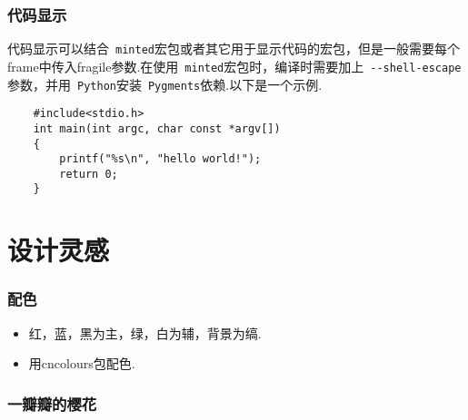 \documentclass{beamer}
\begin{document}
\begin{frame}[fragile]
    \frametitle{代码显示}
    代码显示可以结合~\verb|minted|宏包或者其它用于显示代码的宏包，但是一般需要每个frame中传入fragile参数.在使用~\verb|minted|宏包时，编译时需要加上~\verb|--shell-escape|参数，并用~\verb|Python|安装~\verb|Pygments|依赖.以下是一个示例.
    \begin{verbatim}
    #include<stdio.h>
    int main(int argc, char const *argv[])
    {
        printf("%s\n", "hello world!");
        return 0;
    }
    \end{verbatim}
\end{frame}

\section{设计灵感}
\begin{frame}
    \frametitle{配色}
    \begin{itemize}
        \item 红，蓝，黑为主，绿，白为辅，背景为缟.
        \item 用cncolours包配色.
    \end{itemize}
\end{frame}

\begin{frame}
    \frametitle{一瓣瓣的樱花}
    \begin{figure}
    \centering
    \end{figure}
\end{frame}
\end{document}
